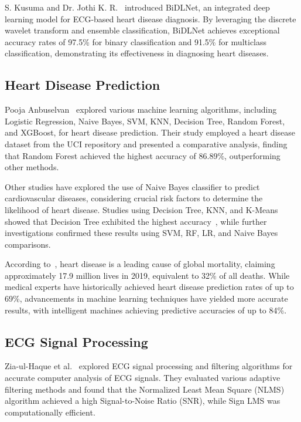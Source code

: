 \documentclass[10pt, twocolumn]{article}
\begin{document}
S. Kusuma and Dr. Jothi K. R.~\cite{kusuma2022} introduced BiDLNet, an integrated deep
learning model for ECG-based heart disease diagnosis.
By leveraging the discrete wavelet transform and ensemble classification, BiDLNet achieves
exceptional accuracy rates of 97.5\% for binary classification and 91.5\% for multiclass
classification, demonstrating its effectiveness in diagnosing heart diseases.

\subsection{Heart Disease Prediction}

Pooja Anbuselvan~\cite{anbuselvan2020} explored various machine learning algorithms,
including Logistic Regression, Naive Bayes, SVM, KNN, Decision Tree, Random Forest, and
XGBoost, for heart disease prediction.
Their study employed a heart disease dataset from the UCI repository and presented a
comparative analysis, finding that Random Forest achieved the highest accuracy of 86.89\%,
outperforming other methods.

Other studies have explored the use of Naive Bayes classifier to predict cardiovascular
diseases, considering crucial risk factors to determine the likelihood of heart disease.
Studies using Decision Tree, KNN, and K-Means showed that Decision Tree exhibited the highest
accuracy~\cite{ramalingam2018}, while further investigations confirmed these results using SVM,
RF, LR, and Naive Bayes comparisons.

According to~\cite{iqbal2022}, heart disease is a leading cause of global mortality,
claiming approximately 17.9 million lives in 2019, equivalent to 32\% of all deaths.
While medical experts have historically achieved heart disease prediction rates of up to
69\%, advancements in machine learning techniques have yielded more accurate results, with
intelligent machines achieving predictive accuracies of up to 84\%.

\subsection{ECG Signal Processing}

Zia-ul-Haque et al.~\cite{ziaulhaque2019} explored ECG signal processing and filtering
algorithms for accurate computer analysis of ECG signals.
They evaluated various adaptive filtering methods and found that the Normalized Least Mean
Square (NLMS) algorithm achieved a high Signal-to-Noise Ratio (SNR), while Sign LMS was
computationally efficient.
\end{document}
